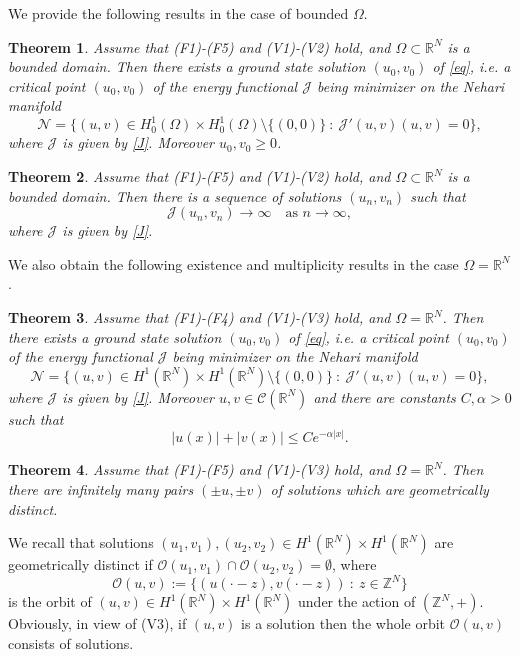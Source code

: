 \documentclass{scrartcl}
\newtheorem{Th}{Theorem}[section]
\newcommand{\cC}{{\mathcal C}}
\newcommand{\cJ}{{\mathcal J}}
\newcommand{\cN}{{\mathcal N}}
\newcommand{\R}{\mathbb{R}}
\numberwithin{equation}{section}
\begin{document}
We provide the following results in the case of bounded $\Omega$.

\begin{Th}\label{Th:Main1}
Assume that (F1)-(F5) and (V1)-(V2) hold, and $\Omega \subset \R^N$ is a bounded domain. Then there exists a ground state solution $(u_0,v_0)$ of \eqref{eq}, i.e. a critical point $(u_0,v_0)$ of the energy functional $\cJ$ being minimizer on the Nehari manifold
$$
\cN = \{ (u,v) \in H^1_0(\Omega) \times H^1_0 (\Omega) \setminus \{(0,0)\} \ : \ \cJ'(u,v) (u,v) = 0 \},
$$
where $\cJ$ is given by \eqref{J}. Moreover $u_0, v_0 \geq 0$.
\end{Th}

\begin{Th}\label{Th:Main2}
Assume that (F1)-(F5) and (V1)-(V2) hold, and $\Omega \subset \R^N$ is a bounded domain. Then there is a sequence of solutions $(u_n, v_n)$ such that
$$
\cJ(u_n, v_n) \to \infty \quad \mbox{as } n \to \infty,
$$
where $\cJ$ is given by \eqref{J}.
\end{Th}

We also obtain the following existence and multiplicity results in the case $\Omega = \R^N$.

\begin{Th}\label{Th:Main3}
Assume that (F1)-(F4) and (V1)-(V3) hold, and $\Omega = \R^N$. Then there exists a ground state solution $(u_0,v_0)$ of \eqref{eq}, i.e. a critical point $(u_0,v_0)$ of the energy functional $\cJ$ being minimizer on the Nehari manifold
$$
\cN = \{ (u,v) \in H^1(\R^N) \times H^1 (\R^N) \setminus \{(0,0)\} \ : \ \cJ'(u,v) (u,v) = 0 \},
$$
where $\cJ$ is given by \eqref{J}. Moreover $u, v \in \cC(\R^N)$ and there are constants $C, \alpha > 0$ such that
$$
|u(x)| + |v(x)| \leq C e^{-\alpha |x|}.
$$
\end{Th}

\begin{Th}\label{Th:Main4}
Assume that (F1)-(F5) and (V1)-(V3) hold, and $\Omega =\R^N$. Then there are infinitely many pairs $(\pm u, \pm v)$ of solutions which are geometrically distinct.
\end{Th}

We recall that solutions $(u_1, v_1), (u_2, v_2) \in H^1 (\R^N) \times H^1(\R^N)$ are geometrically distinct if $\mathcal{O}(u_1, v_1) \cap \mathcal{O}(u_2, v_2) = \emptyset$, where 
$$
\mathcal{O}(u,v) := \{ (u(\cdot - z), v(\cdot -z)) \ : \ z \in \mathbb{Z}^N \}
$$ 
is the orbit of $(u,v) \in H^1 (\R^N) \times H^1(\R^N)$ under the action of $(\mathbb{Z}^N, +)$. Obviously, in view of (V3), if $(u,v)$ is a solution then the whole orbit $\mathcal{O}(u,v)$ consists of solutions.
\end{document}
